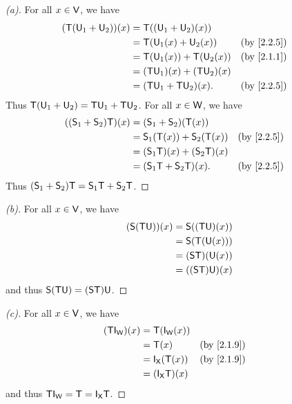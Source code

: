 \begin{proof}[(a)]
  For all \(x \in \mathsf{V}\), we have
  \begin{align*}
    (\T(\U_1 + \U_2))(x) & = \T((\U_1 + \U_2)(x))                                      \\
                         & = \T(\U_1(x) + \U_2(x))       &  & \text{(by \cref{2.2.5})} \\
                         & = \T(\U_1(x)) + \T(\U_2(x))   &  & \text{(by \cref{2.1.1})} \\
                         & = (\T \U_1)(x) + (\T \U_2)(x)                               \\
                         & = (\T \U_1 + \T \U_2)(x).     &  & \text{(by \cref{2.2.5})}
  \end{align*}
  Thus \(\mathsf{T}(\mathsf{U}_1 + \mathsf{U}_2) = \mathsf{T} \mathsf{U}_1 + \mathsf{T} \mathsf{U}_2\).
  For all \(x \in \mathsf{W}\), we have
  \begin{align*}
    ((\vs{S}_1 + \vs{S}_2) \T)(x) & = (\vs{S}_1 + \vs{S}_2)(\T(x))                                      \\
                                  & = \vs{S}_1(\T(x)) + \vs{S}_2(\T(x))   &  & \text{(by \cref{2.2.5})} \\
                                  & = (\vs{S}_1 \T)(x) + (\vs{S}_2 \T)(x)                               \\
                                  & = (\vs{S}_1 \T + \vs{S}_2 \T)(x).     &  & \text{(by \cref{2.2.5})}
  \end{align*}
  Thus \((\mathsf{S}_1 + \mathsf{S}_2) \mathsf{T} = \mathsf{S}_1 \mathsf{T} + \mathsf{S}_2 \mathsf{T}\).
\end{proof}

\begin{proof}[(b)]
  For all \(x \in \mathsf{V}\), we have
  \begin{align*}
    (\mathsf{S} (\mathsf{T} \mathsf{U}))(x) & = \mathsf{S}((\mathsf{T} \mathsf{U})(x))  \\
                        & = \mathsf{S}(\mathsf{T}(\mathsf{U}(x)))   \\
                        & = (\mathsf{S} \mathsf{T})(\mathsf{U}(x))  \\
                        & = ((\mathsf{S} \mathsf{T}) \mathsf{U})(x)
  \end{align*}
  and thus \(\mathsf{S} (\mathsf{T} \mathsf{U}) = (\mathsf{S} \mathsf{T}) \mathsf{U}\).
\end{proof}

\begin{proof}[(c)]
  For all \(x \in \mathsf{V}\), we have
  \begin{align*}
    (\T \IT[\W])(x) & = \T(\IT[\W](x))                                    \\
                    & = \T(x)               &  & \text{(by \cref{2.1.9})} \\
                    & = \IT[\vs{X}](\T(x))  &  & \text{(by \cref{2.1.9})} \\
                    & = (\IT[\vs{X}] \T)(x)
  \end{align*}
  and thus \(\T \IT[\W] = \T = \IT[\vs{X}] \T\).
\end{proof}

